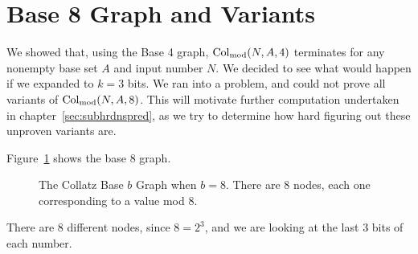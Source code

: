 \section{Base 8 Graph and Variants} \label{subsec:base8graphsubpblms}
We showed that, using the Base 4 graph, $\mathrm{Col}_{\text{mod}}(N,A,4)$ terminates for any nonempty base set $A$ and input number $N$. We decided to see what would happen if we expanded to $k = 3$ bits. We ran into a problem, and could not prove all variants of $\mathrm{Col}_{\text{mod}}(N,A,8)$. This will motivate further computation undertaken in chapter~\ref{sec:subhrdnspred}, as we try to determine how hard figuring out these unproven variants are. \par
Figure~\ref{fig:base_8_graph} shows the base 8 graph.
\begin{figure}
    \centering
    \caption{The Collatz Base $b$ Graph when $b = 8$. There are 8 nodes, each one corresponding to a value mod 8.}
    \label{fig:base_8_graph}
\end{figure}
There are 8 different nodes, since $8 = 2^3$, and we are looking at the last 3 bits of each number. 
